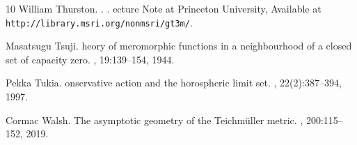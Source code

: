 \documentclass[dvipdfmx]{amsart}
\theoremstyle{remark}
\begin{document}
\begin{thebibliography}{10}
William {Thurston}.
.
.
ecture {N}ote at {P}rinceton {U}niversity, {A}vailable at {\tt http://library.msri.org/nonmsri/gt3m/}.

Masatsugu Tsuji.
heory of meromorphic functions in a neighbourhood of a closed set of capacity zero.
, 19:139--154, 1944.

Pekka Tukia.
onservative action and the horospheric limit set.
, 22(2):387--394, 1997.

Cormac Walsh.
\newblock The asymptotic geometry of the {T}eichm\"uller metric.
, 200:115--152, 2019.

\end{thebibliography}
\end{document}

